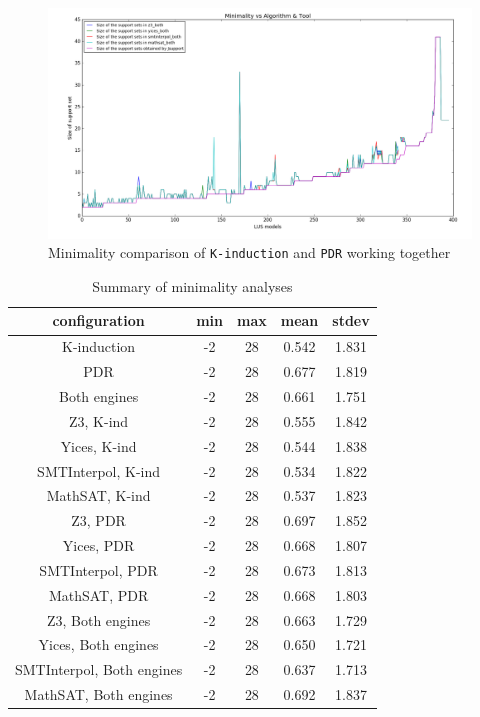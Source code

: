 \begin{figure}
  \centering
  \includegraphics[width=\textwidth]{figs/minimality_both.png}
  \caption{Minimality comparison of \texttt{K-induction} and \texttt{PDR} working together}\label{fig:minboth}
\end{figure}

\begin{table}
  \centering
  \begin{tabular}{|c|c|c|c|c|}
     \hline
     configuration & min & max & mean & stdev \\[0.5ex]
     \hline\hline
     K-induction & -2 & 28 & 0.542 & 1.831 \\[0.5ex]
     PDR & -2 & 28 & 0.677 & 1.819 \\[0.5ex]
     Both engines & -2 & 28 & 0.661 & 1.751 \\[0.5ex]
     \hline
     Z3, K-ind & -2 & 28 & 0.555 & 1.842 \\[0.5ex]
     Yices, K-ind & -2 & 28 & 0.544 & 1.838 \\[0.5ex]
     SMTInterpol, K-ind & -2 & 28 & 0.534 & 1.822 \\[0.5ex]
     MathSAT, K-ind & -2 & 28 & 0.537 & 1.823 \\[0.5ex]
     \hline
     Z3, PDR & -2 & 28 & 0.697 & 1.852 \\[0.5ex]
     Yices, PDR & -2 & 28 & 0.668 & 1.807 \\[0.5ex]
     SMTInterpol, PDR & -2 & 28 & 0.673 & 1.813 \\[0.5ex]
     MathSAT, PDR & -2 & 28 & 0.668 & 1.803 \\[0.5ex]
     \hline
     Z3, Both engines & -2 & 28 & 0.663 & 1.729 \\[0.5ex]
     Yices, Both engines & -2 & 28 & 0.650 & 1.721 \\[0.5ex]
     SMTInterpol, Both engines & -2 & 28 & 0.637 & 1.713 \\[0.5ex]
     MathSAT, Both engines & -2 & 28 & 0.692 & 1.837 \\[0.5ex]
     \hline     
   \end{tabular}
  \caption{\small{Summary of minimality analyses}}\label{tab:minimality}
\end{table}


